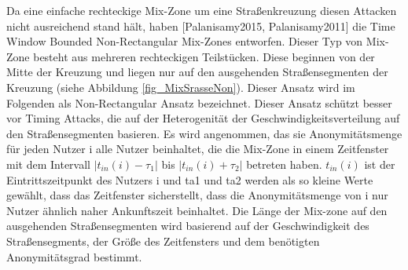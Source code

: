 Da eine einfache rechteckige Mix-Zone um eine Straßenkreuzung diesen Attacken nicht ausreichend stand hält, haben [Palanisamy2015, Palanisamy2011] die Time Window Bounded Non-Rectangular Mix-Zones entworfen. Dieser Typ von Mix-Zone besteht aus mehreren rechteckigen Teilstücken.  Diese beginnen von der Mitte der Kreuzung und liegen nur auf den ausgehenden Straßensegmenten der Kreuzung  (siehe Abbildung \ref{fig_MixSrasseNon}). Dieser Ansatz wird im Folgenden als Non-Rectangular Ansatz bezeichnet. Dieser Ansatz schützt besser vor Timing Attacks, die auf der Heterogenität der  Geschwindigkeitsverteilung auf den Straßensegmenten basieren. Es wird angenommen, das sie Anonymitätsmenge für jeden Nutzer i alle Nutzer beinhaltet, die die Mix-Zone in einem Zeitfenster mit dem Intervall $| t_{in}(i)-\tau_{1}|$ bis $|t_{in}(i)+\tau_{2}|$ betreten haben. $t_{in}(i)$ ist der Eintrittszeitpunkt des Nutzers i und ta1 und ta2 werden als so kleine Werte gewählt, dass das Zeitfenster sicherstellt, dass die Anonymitätsmenge von i nur Nutzer ähnlich naher Ankunftszeit beinhaltet. Die Länge der Mix-zone auf den ausgehenden Straßensegmenten  wird basierend auf der Geschwindigkeit des Straßensegments, der Größe des Zeitfensters und dem benötigten Anonymitätsgrad bestimmt.     